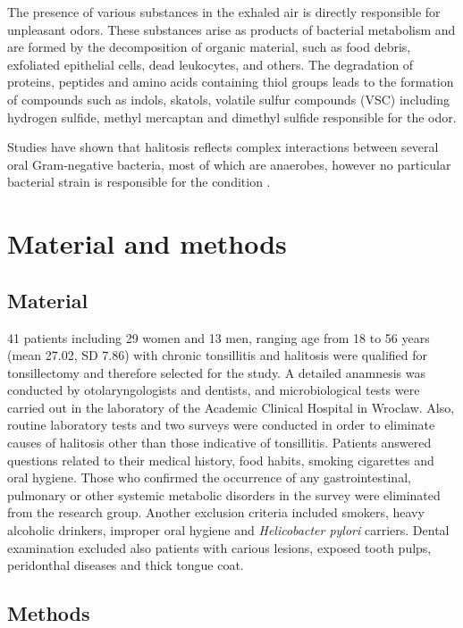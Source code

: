 \documentclass[12pt,a4paper,notitlepage]{report}
\begin{document}
The presence of various substances in the exhaled air is directly responsible for unpleasant odors. These substances arise as products of bacterial   metabolism and are formed by the decomposition of organic material, such as food debris, exfoliated epithelial cells, dead leukocytes, and others. The degradation of proteins, peptides and amino acids containing thiol groups leads to the formation of compounds such as indols, skatols, volatile sulfur compounds (VSC) including hydrogen sulfide, methyl mercaptan and dimethyl sulfide responsible for the odor.

Studies have shown that halitosis reflects complex interactions between several oral Gram-negative bacteria, most of which are anaerobes, however no particular bacterial strain is responsible for the condition \cite{Kotti15}.


\chapter{Material and methods}
\section{Material}

41 patients including 29 women and 13 men, ranging age from 18 to 56 years (mean 27.02, SD 7.86) with chronic tonsillitis and halitosis were qualified for tonsillectomy and therefore selected for the study. A detailed anamnesis was conducted by otolaryngologists and dentists, and microbiological tests were carried out in the laboratory of the Academic Clinical Hospital in Wroclaw. Also, routine laboratory tests and two surveys were conducted in order to eliminate causes of halitosis other than those indicative of tonsillitis. Patients answered questions related to their medical history, food habits, smoking cigarettes and oral hygiene. 
Those who confirmed the occurrence of any gastrointestinal, pulmonary or other systemic metabolic disorders in the survey were eliminated from the research group.
Another exclusion criteria included smokers, heavy alcoholic drinkers, improper oral hygiene and \textit{Helicobacter pylori} carriers. Dental examination excluded also patients with carious lesions, exposed tooth pulps, peridonthal diseases and thick tongue coat.

\section{Methods}
\end{document}
